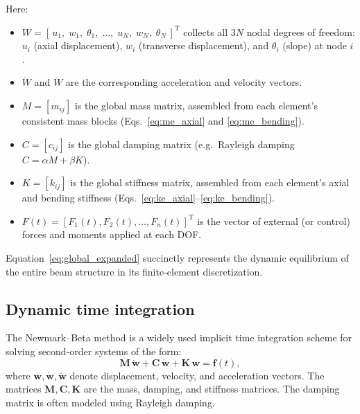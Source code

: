 \documentclass{article}
\begin{document}
	Here:
	\begin{itemize}
		\item \(W = [\,u_1,\;w_1,\;\theta_1,\;\dots,\;u_N,\;w_N,\;\theta_N\,]^\text{T}\) collects all \(3N\) nodal degrees of freedom: 
		\(u_i\) (axial displacement), \(w_i\) (transverse displacement), and \(\theta_i\) (slope) at node \(i\).
		\item \(\ddot W\) and \(\dot W\) are the corresponding acceleration and velocity vectors.
		\item \(M = [m_{ij}]\) is the global mass matrix, assembled from each element’s consistent mass blocks (Eqs.~\eqref{eq:me_axial} and \eqref{eq:me_bending}).
		\item \(C = [c_{ij}]\) is the global damping matrix (e.g.\ Rayleigh damping \(C=\alpha M + \beta K\)).
		\item \(K = [k_{ij}]\) is the global stiffness matrix, assembled from each element’s axial and bending stiffness (Eqs.~\eqref{eq:ke_axial}–\eqref{eq:ke_bending}).
		\item \(F(t) = [F_1(t),F_2(t),\dots,F_n(t)]^\text{T}\) is the vector of external (or control) forces and moments applied at each DOF.
	\end{itemize}
	
	Equation~\eqref{eq:global_expanded} succinctly represents the dynamic equilibrium of the entire beam structure in its finite‐element discretization.
	
		

	
	\subsection{Dynamic time integration}

	The Newmark--Beta method is a widely used implicit time integration scheme for solving second-order systems of the form:
	\begin{equation}
		\mathit{\mathbf{M}}\, \ddot{\mathit{\mathbf{w}}} + \mathit{\mathbf{C}}\, \dot{\mathit{\mathbf{w}}} + \mathit{\mathbf{K}}\, \mathit{\mathbf{w}} = \mathit{\mathbf{f}}(t),
	\end{equation}
	where \( \mathit{\mathbf{w}}, \dot{\mathit{\mathbf{w}}}, \ddot{\mathit{\mathbf{w}}} \) denote displacement, velocity, and acceleration vectors. The matrices \( \mathit{\mathbf{M}}, \mathit{\mathbf{C}}, \mathit{\mathbf{K}} \) are the mass, damping, and stiffness matrices. The damping matrix is often modeled using Rayleigh damping.
	
\end{document}

